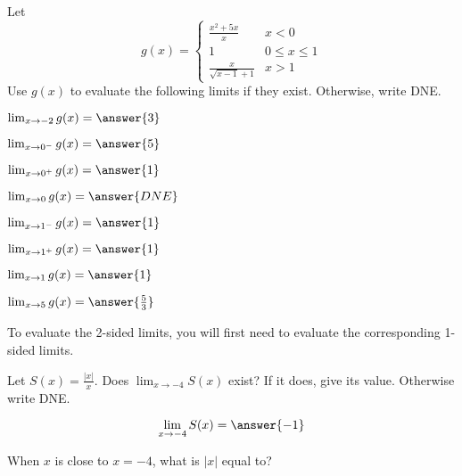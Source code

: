 \documentclass[handout]{ximera}
\begin{document}
\begin{exercise}
Let
\[
g(x) = \begin{cases}
  \frac{x^2+5x}{x}  & x<0 \\
  1 & 0 \leq x \leq 1 \\
  \frac{x}{\sqrt{x-1} +1} & x>1
\end{cases}
\]
Use $g(x)$ to evaluate the following limits if they exist.  Otherwise, write DNE.

\begin{itemize}

\begin{multicols}{2}

\item [] $\lim_{x \to -2} g(x) = \answer{3}$

\item [] $\lim_{x \to 0^-} g(x) = \answer{5}$

\item [] $\lim_{x \to 0^+} g(x) = \answer{1}$

\item [] $\lim_{x \to 0} g(x) = \answer{DNE}$

\item [] $\lim_{x \to 1^-} g(x) = \answer{1}$

\item [] $\lim_{x \to 1^+} g(x) = \answer{1}$

\item [] $\lim_{x \to 1} g(x) = \answer{1}$

\item [] $\lim_{x \to 5} g(x) = \answer{\frac{5}{3}}$

\end{multicols}

\end{itemize}

\begin{hint}

To evaluate the 2-sided limits, you will first need to evaluate the corresponding 1-sided limits. 

\end{hint}

\end{exercise}

\begin{exercise}
Let $S(x) = \frac{|x|}{x}$.  Does $\displaystyle\lim_{x \to -4} S(x)$ exist?  If it
does, give its value.  Otherwise write DNE.

\[
\lim_{x \to -4} S(x) = \answer{-1}
\] 

\begin{hint}
When $x$ is close to $x=-4$, what is $|x|$ equal to? 
\end{hint}

\end{exercise}
\end{document}
